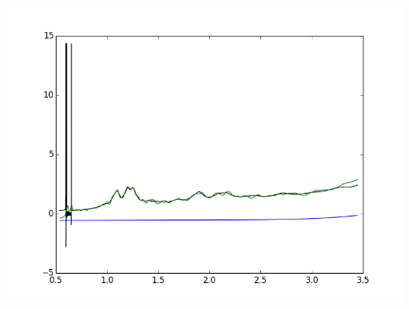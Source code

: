 \documentclass{article}
\begin{document}
\includegraphics{"normPXD1-671-D20.asc.png"}
\end{document}
